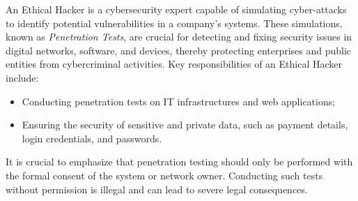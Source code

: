 An Ethical Hacker is a cybersecurity expert capable of simulating cyber-attacks to identify potential vulnerabilities in a company's systems. These simulations, known as \emph{Penetration Tests}, are crucial for detecting and fixing security issues in digital networks, software, and devices, thereby protecting enterprises and public entities from cybercriminal activities. Key responsibilities of an Ethical Hacker include:
\begin{itemize}
    \item Conducting penetration tests on IT infrastructures and web applications;
    \item Ensuring the security of sensitive and private data, such as payment details, login credentials, and passwords.
\end{itemize}

It is crucial to emphasize that penetration testing should only be performed with the formal consent of the system or network owner. Conducting such tests without permission is illegal and can lead to severe legal consequences.
